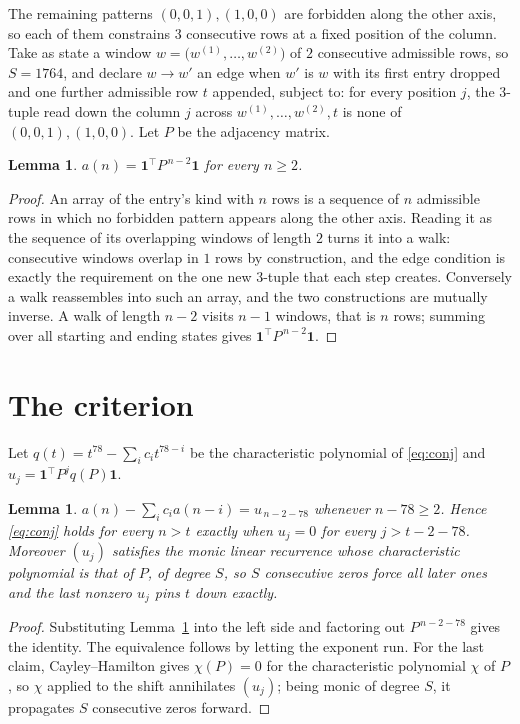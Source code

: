 \documentclass[11pt,a4paper]{article}
\theoremstyle{plain}
\newtheorem{lemma}[theorem]{Lemma}
\theoremstyle{definition}
\begin{document}
The remaining patterns $(0,0,1), (1,0,0)$ are forbidden along the other axis, so each of them
constrains $3$ consecutive rows at a fixed position of the column. Take as state a
window $w=\bigl(w^{(1)},\dots,w^{(2)}\bigr)$ of $2$ consecutive admissible
rows, so $S=1764$, and declare $w\to w'$ an edge when $w'$ is $w$ with its first entry
dropped and one further admissible row $t$ appended, subject to: for every position
$j$, the $3$-tuple read down the column $j$ across $w^{(1)},\dots,w^{(2)},t$
is none of $(0,0,1), (1,0,0)$. Let $P$ be the adjacency matrix.

\begin{lemma}\label{lem:walk}
$a(n)=\mathbf{1}^{\!\top}P^{\,n-2}\mathbf{1}$ for every $n\ge2$.
\end{lemma}

\begin{proof}
An array of the entry's kind with $n$ rows is a sequence of $n$ admissible rows in
which no forbidden pattern appears along the other axis. Reading it as the sequence of its
overlapping windows of length $2$ turns it into a walk: consecutive windows overlap in
$1$ rows by construction, and the edge condition is exactly the requirement on the one
new $3$-tuple that each step creates. Conversely a walk reassembles into such an array,
and the two constructions are mutually inverse. A walk of length $n-2$ visits $n-1$
windows, that is $n$ rows; summing over all starting and ending states gives
$\mathbf{1}^{\!\top}P^{\,n-2}\mathbf{1}$.
\end{proof}

\section{The criterion}

Let $q(t)=t^{78}-\sum_i c_i t^{78-i}$ be the characteristic polynomial of
\eqref{eq:conj} and $u_j=\mathbf{1}^{\!\top}P^{j}q(P)\mathbf{1}$.

\begin{lemma}\label{lem:crit}
$a(n)-\sum_i c_i a(n-i)=u_{\,n-2-78}$ whenever $n-78\ge2$. Hence
\eqref{eq:conj} holds for every $n>t$ exactly when $u_j=0$ for every
$j>t-2-78$. Moreover $(u_j)$ satisfies the monic linear recurrence whose
characteristic polynomial is that of $P$, of degree $S$, so $S$ consecutive zeros force all
later ones and the last nonzero $u_j$ pins $t$ down exactly.
\end{lemma}

\begin{proof}
Substituting Lemma~\ref{lem:walk} into the left side and factoring out
$P^{\,n-2-78}$ gives the identity. The equivalence follows by letting the exponent
run. For the last claim, Cayley--Hamilton gives $\chi(P)=0$ for the characteristic
polynomial $\chi$ of $P$, so $\chi$ applied to the shift annihilates $(u_j)$; being monic of
degree $S$, it propagates $S$ consecutive zeros forward.
\end{proof}
\end{document}
